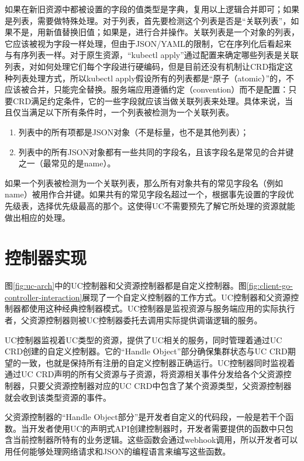 \documentclass[macfonts,master]{njuthesis}
\begin{document}
如果在新旧资源中都被设置的字段的值类型是字典，复用以上逻辑合并即可；如果是列表，需要做特殊处理。对于列表，首先要检测这个列表是否是``关联列表''，如果不是，用新值替换旧值；如果是，进行合并操作。关联列表是一个对象的列表，它应该被视为字段一样处理，但由于JSON/YAML的限制，它在序列化后看起来与有序列表一样。对于原生资源，``kubectl apply''通过配置来确定哪些列表是关联列表，对如何处理它们每个字段进行硬编码，但是目前还没有机制让CRD指定这种列表处理方式，所以kubectl apply假设所有的列表都是``原子（atomic）''的，不应该被合并，只能完全替换。服务端应用遵循约定（convention）而不是配置：只要CRD满足约定条件，它的一些字段就应该当做关联列表来处理。具体来说，当且仅当满足以下所有条件时，一个列表被检测为一个关联列表。

\begin{enumerate}
	\item 列表中的所有项都是JSON对象（不是标量，也不是其他列表）；
	\item 列表中的所有JSON对象都有一些共同的字段名，且该字段名是常见的合并键之一（最常见的是name）。
\end{enumerate}

如果一个列表被检测为一个关联列表，那么所有对象共有的常见字段名（例如name）被用作合并键。如果共有的常见字段名超过一个，根据事先设置的字段优先级表，选择优先级最高的那个。这使得UC不需要预先了解它所处理的资源就能做出相应的处理。


\section{控制器实现}

图\ref{fig:uc-arch}中的UC控制器和父资源控制器都是自定义控制器。图\ref{fig:client-go-controller-interaction}展现了一个自定义控制器的工作方式。UC控制器和父资源控制器都使用这种经典控制器模式。UC控制器是监视资源与服务端应用的实际执行者，父资源控制器则被UC控制器委托去调用实际提供调谐逻辑的服务。

UC控制器监视着UC类型的资源，提供了UC相关的服务，同时管理着通过UC CRD创建的自定义控制器。它的``Handle Object''部分确保集群状态与UC CRD期望的一致，也就是保持所有注册的自定义控制器正确运行。UC控制器同时监视着通过UC CRD声明的所有父资源与子资源，将资源相关事件分发给各个父资源控制器，只要父资源控制器对应的UC CRD中包含了某个资源类型，父资源控制器就会收到该类型资源的事件。

父资源控制器的``Handle Object部分''是开发者自定义的代码段，一般是若干个函数。当开发者使用UC的声明式API创建控制器时，开发者需要提供的函数中只包含当前控制器所特有的业务逻辑。这些函数会通过webhook调用，所以开发者可以用任何能够处理网络请求和JSON的编程语言来编写这些函数。
\end{document}
